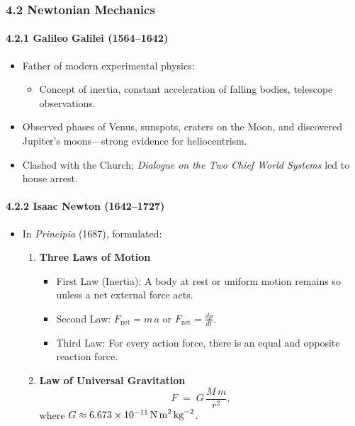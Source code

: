 \subsubsection{4.2 Newtonian Mechanics}

\paragraph{4.2.1 Galileo Galilei (1564--1642)}
\begin{itemize}
  \item Father of modern experimental physics:
  \begin{itemize}
    \item Concept of inertia, constant acceleration of falling bodies, telescope observations.
  \end{itemize}
  \item Observed phases of Venus, sunspots, craters on the Moon, and discovered Jupiter’s moons---strong evidence for heliocentrism.
  \item Clashed with the Church; \emph{Dialogue on the Two Chief World Systems} led to house arrest.
\end{itemize}

\paragraph{4.2.2 Isaac Newton (1642--1727)}
\begin{itemize}
  \item In \emph{Principia} (1687), formulated:
  \begin{enumerate}
    \item \textbf{Three Laws of Motion}
    \begin{itemize}
      \item First Law (Inertia): A body at rest or uniform motion remains so unless a net external force acts.
      \item Second Law: $F_{\text{net}} = m\,a$ or $F_{\text{net}} = \frac{dp}{dt}$.
      \item Third Law: For every action force, there is an equal and opposite reaction force.
    \end{itemize}
    \item \textbf{Law of Universal Gravitation}
    \[
      F \;=\; G\,\frac{M\,m}{r^2},
    \]
    where $G \approx 6.673 \times 10^{-11}\,\text{N\,m}^2\,\text{kg}^{-2}$.
  \end{enumerate}
\end{itemize}

